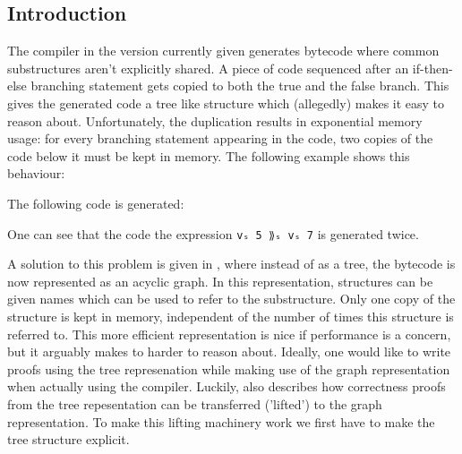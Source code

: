 \documentclass[a4paper]{article}
\begin{document}


                     
        \subsection{Introduction}
        The compiler in the version currently given generates bytecode where common substructures aren't explicitly shared. A piece of code
        sequenced after an if-then-else branching statement gets copied to both the true and the false branch. This
        gives the generated code a tree like structure which (allegedly) makes it easy to reason about. Unfortunately, 
        the duplication results in exponential memory usage: for every branching statement appearing in the code, two 
        copies of the code below it must be kept in memory. The following example shows this behaviour:
        
        
        The following code is generated:
        
        
        One can see that the code the expression \texttt{vₛ 5 ⟫ₛ vₛ 7} is generated twice.
        
        A solution to this problem is given in \cite{compiler-correctness-structured-graphs},
        where instead of as a tree, the bytecode is now represented as an acyclic graph. In this representation, structures
        can be given names which can be used to refer to the substructure. Only one copy of the structure is kept in memory, 
        independent of the number of times this structure is referred to. This more efficient representation
        is nice if performance is a concern, but it arguably makes to harder to reason about. Ideally, one would like to 
        write proofs using the tree represenation while making use of the graph representation when actually using the compiler. 
        Luckily, \cite{compiler-correctness-structured-graphs} also describes how correctness proofs from the tree repesentation 
        can be transferred ('lifted') to the graph representation. To make this lifting machinery work we first have to make the 
        tree structure explicit.
                     
\end{document}

